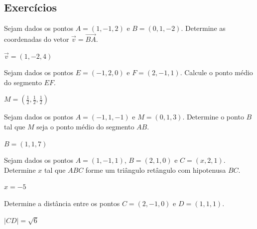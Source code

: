 \subsection*{Exercícios}

\begin{exer}
  Sejam dados os pontos $A=(1,-1,2)$ e $B=(0,1,-2)$. Determine as coordenadas do vetor $\vec{v}=\overrightarrow{BA}$.
\end{exer}
\begin{resp}
  $\vec{v}=(1,-2,4)$
\end{resp}

\begin{exer}
  Sejam dados os pontos $E=(-1,2,0)$ e $F=(2,-1,1)$. Calcule o ponto médio do segmento $EF$.
\end{exer}
\begin{resp}
  $\displaystyle M=\left(\frac{1}{2},\frac{1}{2},\frac{1}{2}\right)$
\end{resp}

\begin{exer}
  Sejam dados os pontos $A=(-1,1,-1)$ e $M=(0,1,3)$. Determine o ponto $B$ tal que $M$ seja o ponto médio do segmento $AB$.
\end{exer}
\begin{resp}
  $B=(1,1,7)$
\end{resp}

\begin{exer}
  Sejam dados os pontos $A=(1,-1,1)$, $B=(2,1,0)$ e $C=(x,2,1)$. Determine $x$ tal que $ABC$ forme um triângulo retângulo com hipotenusa $BC$.
\end{exer}
\begin{resp}
  $x=-5$
\end{resp}

\begin{exer}
  Determine a distância entre os pontos $C=(2,-1,0)$ e $D=(1,1,1)$.
\end{exer}
\begin{resp}
  $|CD|=\sqrt{6}$
\end{resp}